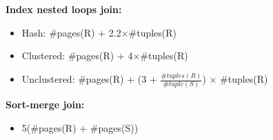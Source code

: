 \begin{problem}{12.6}
  \begin{solution}
    \textbf{Index nested loops join:} \\
    \begin{itemize}
      \item Hash: \#pages(R) + 2.2$\times$\#tuples(R)\\
      \item Clustered: \#pages(R) + 4$\times$\#tuples(R) \\
      \item Unclustered: \#pages(R) + (3 + $\frac{\#tuples(R)}{\#tuple(S)}$) $\times$ \#tuples(R) \\
    \end{itemize}
    \textbf{Sort-merge join:}\\
    \begin{itemize}
      \item 5(\#pages(R) + \#pages(S))
    \end{itemize}
  \end{solution}
\end{problem}



